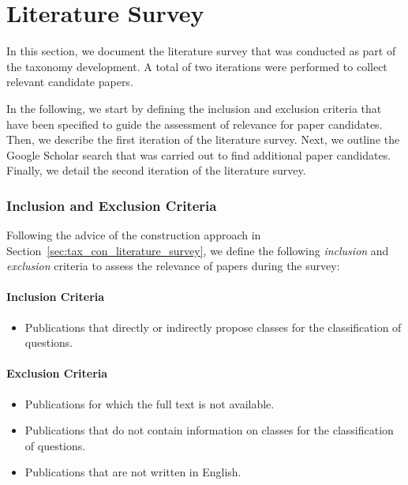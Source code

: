 
\section{Literature Survey}
\label{sec:literature_Survey}

In this section, we document the literature survey that was conducted as part of the taxonomy development. A total of two iterations were performed to collect relevant candidate papers.

In the following, we start by defining the inclusion and exclusion criteria that have been specified to guide the assessment of relevance for paper candidates. Then, we describe the first iteration of the literature survey. Next, we outline the Google Scholar search that was carried out to find additional paper candidates. Finally, we detail the second iteration of the literature survey.


\subsubsection{Inclusion and Exclusion Criteria}
Following the advice of the construction approach in Section~\ref{sec:tax_con_literature_survey}, we define the following \emph{inclusion} and \emph{exclusion} criteria to assess the relevance of papers during the survey:

\paragraph{Inclusion Criteria}
\begin{itemize}
    \item Publications that directly or indirectly propose classes for the classification of questions.
\end{itemize}

\paragraph{Exclusion Criteria}
\begin{itemize}
    \item Publications for which the full text is not available.
    \item Publications that do not contain information on classes for the classification of questions.
    \item Publications that are not written in English.
\end{itemize}

